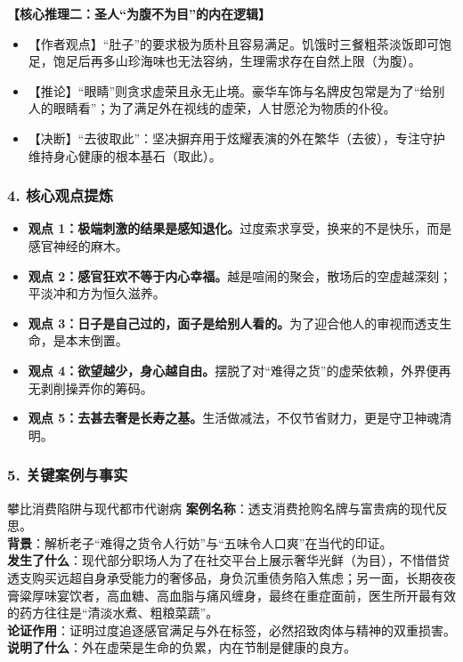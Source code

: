 \noindent\textbf{【核心推理二：圣人“为腹不为目”的内在逻辑】}
\begin{itemize}
    \item 【作者观点】“肚子”的要求极为质朴且容易满足。饥饿时三餐粗茶淡饭即可饱足，饱足后再多山珍海味也无法容纳，生理需求存在自然上限（为腹）。
    \item 【推论】“眼睛”则贪求虚荣且永无止境。豪华车饰与名牌皮包常是为了“给别人的眼睛看”；为了满足外在视线的虚荣，人甘愿沦为物质的仆役。
    \item 【决断】“去彼取此”：坚决摒弃用于炫耀表演的外在繁华（去彼），专注守护维持身心健康的根本基石（取此）。
\end{itemize}

\subsubsection{4. 核心观点提炼}
\begin{itemize}
    \item \textbf{观点 1：极端刺激的结果是感知退化。}过度索求享受，换来的不是快乐，而是感官神经的麻木。
    \item \textbf{观点 2：感官狂欢不等于内心幸福。}越是喧闹的聚会，散场后的空虚越深刻；平淡冲和方为恒久滋养。
    \item \textbf{观点 3：日子是自己过的，面子是给别人看的。}为了迎合他人的审视而透支生命，是本末倒置。
    \item \textbf{观点 4：欲望越少，身心越自由。}摆脱了对“难得之货”的虚荣依赖，外界便再无剥削操弄你的筹码。
    \item \textbf{观点 5：去甚去奢是长寿之基。}生活做减法，不仅节省财力，更是守卫神魂清明。
\end{itemize}

\subsubsection{5. 关键案例与事实}
\begin{CaseBox}{攀比消费陷阱与现代都市代谢病}
\textbf{案例名称}：透支消费抢购名牌与富贵病的现代反思。\\
\textbf{背景}：解析老子“难得之货令人行妨”与“五味令人口爽”在当代的印证。\\
\textbf{发生了什么}：现代部分职场人为了在社交平台上展示奢华光鲜（为目），不惜借贷透支购买远超自身承受能力的奢侈品，身负沉重债务陷入焦虑；另一面，长期夜夜膏粱厚味宴饮者，高血糖、高血脂与痛风缠身，最终在重症面前，医生所开最有效的药方往往是“清淡水煮、粗粮菜蔬”。\\
\textbf{论证作用}：证明过度追逐感官满足与外在标签，必然招致肉体与精神的双重损害。\\
\textbf{说明了什么}：外在虚荣是生命的负累，内在节制是健康的良方。
\end{CaseBox}

